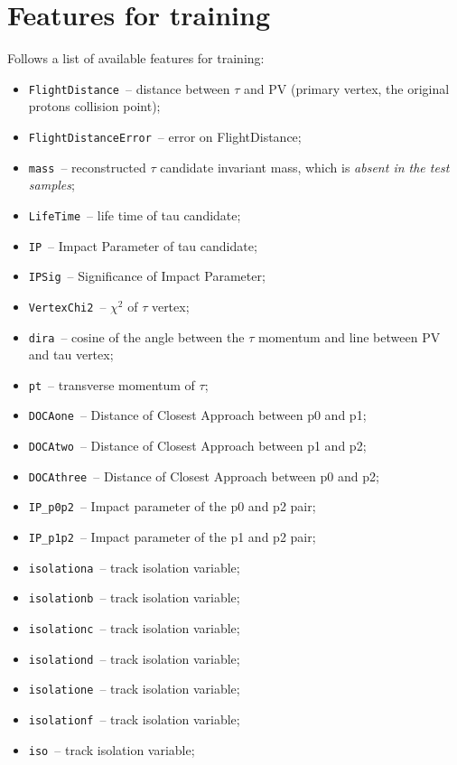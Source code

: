 \documentclass[conference]{IEEEtran}
\begin{document}
\clearpage
\appendix

\section{Features for training}
\label{sec:features}
Follows a list of available features for training:
\begin{itemize}
	\item \texttt{FlightDistance}~-- distance between $\tau$ and PV (primary vertex, the
	original protons collision point);
	\item \texttt{FlightDistanceError}~-- error on FlightDistance;
	\item \texttt{mass}~-- reconstructed $\tau$ candidate invariant mass, which
	is \textit{absent in the test samples};
	\item \texttt{LifeTime}~-- life time of tau candidate;
	\item \texttt{IP}~-- Impact Parameter of tau candidate;
	\item \texttt{IPSig}~-- Significance of Impact Parameter;
	\item \texttt{VertexChi2}~-- $\chi^2$ of $\tau$ vertex;
	\item \texttt{dira}~-- cosine of the angle between the $\tau$ momentum and line
	between PV and tau vertex;
	\item \texttt{pt}~-- transverse momentum of $\tau$;
	\item \texttt{DOCAone}~-- Distance of Closest Approach between p0 and p1;
	\item \texttt{DOCAtwo}~-- Distance of Closest Approach between p1 and p2;
	\item \texttt{DOCAthree}~-- Distance of Closest Approach between p0 and p2;
	\item \texttt{IP\_p0p2}~-- Impact parameter of the p0 and p2 pair;
	\item \texttt{IP\_p1p2}~-- Impact parameter of the p1 and p2 pair;
	\item \texttt{isolationa}~-- track isolation variable;
	\item \texttt{isolationb}~-- track isolation variable;
	\item \texttt{isolationc}~-- track isolation variable;
	\item \texttt{isolationd}~-- track isolation variable;
	\item \texttt{isolatione}~-- track isolation variable;
	\item \texttt{isolationf}~-- track isolation variable;
	\item \texttt{iso}~-- track isolation variable;

\end{itemize}
\end{document}
